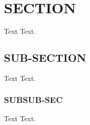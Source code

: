 
\section{SECTION}

Text Text.



\subsection{SUB-SECTION}

Text Text.



\subsubsection{SUBSUB-SEC}

Text Text.